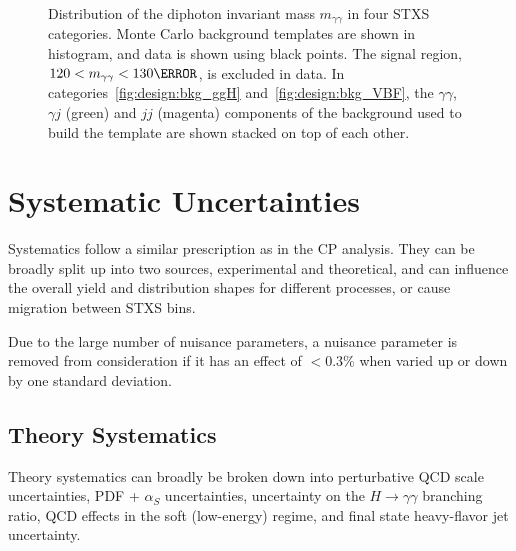 \begin{figure}[!htbp]
\caption{Distribution of the diphoton invariant mass $m_{\gamma \gamma}$ in four STXS categories. Monte Carlo background templates are shown in histogram, and data is shown using black points. The signal region, $120 < m_{\gamma \gamma} < 130 \GeV$, is excluded in data. In categories~\ref{fig:design:bkg_ggH} and~\ref{fig:design:bkg_VBF}, the $\gamma \gamma$, $\gamma j$ (green) and $jj$ (magenta) components of the background used to build the template are shown stacked on top of each other. }
\label{fig:design:bkg}
\end{figure}

\section{Systematic Uncertainties} \label{sec:Systematics} 

Systematics follow a similar prescription as in the CP analysis. They can be broadly split up into two sources, experimental and theoretical, and can influence the overall yield and distribution shapes for different processes, or cause migration between STXS bins. 

Due to the large number of nuisance parameters, a nuisance parameter is removed from consideration if it has an effect of $< 0.3\%$ when varied up or down by one standard deviation.

\subsection{Theory Systematics} \label{subsec:Theorysysts}

Theory systematics can broadly be broken down into perturbative QCD scale uncertainties, PDF + $\alpha_{S}$ uncertainties, uncertainty on the $H \rightarrow \gamma \gamma$ branching ratio, QCD effects in the soft (low-energy) regime, and final state heavy-flavor jet uncertainty.

